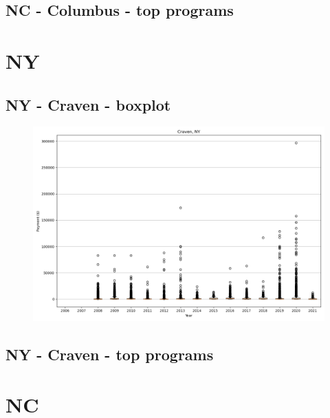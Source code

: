 \subsection*{NC - Columbus - top programs}

\newpage
\section*{NY}
\subsection*{NY - Craven - boxplot}
\begin{figure}[h]
\centering
\includegraphics[width=7in]{../output/boxplots/counties/Craven-NY_boxplot.png}
\end{figure}


\subsection*{NY - Craven - top programs}

\newpage
\section*{NC}
